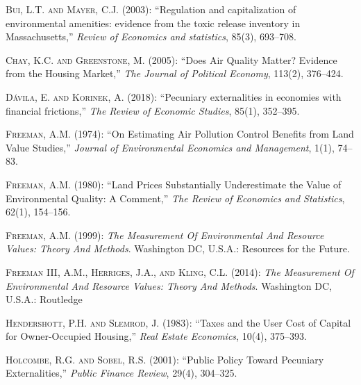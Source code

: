 \documentclass[ecta,nameyear,draft]{econsocart}
\theoremstyle{plain}
\theoremstyle{remark}
\begin{document}
\begin{thebibliography}{}
\textsc{Bui, L.T. and Mayer, C.J.} (2003):
``Regulation and capitalization of environmental amenities: evidence from the toxic release inventory in Massachusetts,''
\textit{Review of Economics and statistics}, 85(3), 693--708.
\endbibitem


\textsc{Chay, K.C. and Greenstone, M.} (2005):
``Does Air Quality Matter? Evidence from the Housing Market,''
\textit{The Journal of Political Economy}, 113(2), 376--424.
\endbibitem
 
\textsc{Dávila, E. and Korinek, A.} (2018):
``Pecuniary externalities in economies with financial frictions,''
\textit{The Review of Economic Studies}, 85(1), 352--395.
\endbibitem

\textsc{Freeman, A.M.} (1974):
``On Estimating Air Pollution Control Benefits from Land Value Studies,''
\textit{Journal of Environmental Economics and Management}, 1(1), 74--83.
\endbibitem

\textsc{Freeman, A.M.} (1980):
``Land Prices Substantially Underestimate the Value of Environmental Quality: A Comment,''
\textit{The Review of Economics and Statistics}, 62(1), 154--156.
\endbibitem


\textsc{Freeman, A.M.} (1999):
\textit{The Measurement Of Environmental And Resource Values: Theory And Methods}.
Washington DC, U.S.A.: Resources for the Future.
\endbibitem
 
\textsc{Freeman III, A.M., Herriges, J.A., and Kling, C.L.} (2014):
\textit{The Measurement Of Environmental And Resource Values: Theory And Methods}.
Washington DC, U.S.A.: Routledge
\endbibitem 

\textsc{Hendershott, P.H. and Slemrod, J.} (1983):
``Taxes and the User Cost of Capital for Owner-Occupied Housing,''
\textit{Real Estate Economics}, 10(4), 375--393.
\endbibitem

\textsc{Holcombe, R.G. and Sobel, R.S.} (2001):
``Public Policy Toward Pecuniary Externalities,''
\textit{Public Finance Review}, 29(4), 304--325.
\endbibitem


\end{thebibliography}
\end{document}
